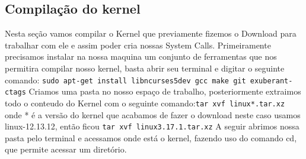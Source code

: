 \documentclass[12pt]{article}
\begin{document}
\subsection{Compilação do kernel}
	Nesta seção vamos compilar o Kernel que previamente fizemos o Download para trabalhar com ele e assim poder cria nossas System Calls.
	Primeiramente precisamos instalar na nossa maquina um conjunto de ferramentas que nos permitira compilar nosso kernel, basta abrir seu terminal e digitar o seguinte comando:\newline
	\verb!sudo apt-­get install libncurses5­dev gcc make git exuberant­ctags! 
	\newline
	Criamos uma pasta no nosso espaço de trabalho, posteriormente extraimos todo o conteudo do Kernel com o seguinte comando:\newline \verb!tar xvf linux­­*.tar.xz! \newline onde * é a versão do kernel que acabamos de fazer o download neste caso usamos linux-12.13.12, então ficou\newline
	\verb!tar xvf linux­3.17.1.tar.xz!\newline
	A seguir abrimos nossa pasta pelo terminal e acessamos onde está o kernel, fazendo uso do comando cd, que permite acessar um diretório.
\end{document}
